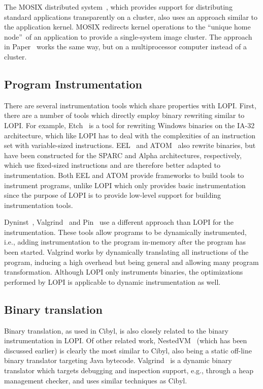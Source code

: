 The MOSIX distributed system~\cite{mosix}, which provides support for
distributing standard applications transparently on a cluster, also uses an
approach similar to the application kernel. MOSIX redirects kernel operations
to the ``unique home node''~of an application to provide a single-system image
cluster.  The approach in Paper~ works the same way,
but on a multiprocessor computer instead of a cluster.


\subsection{Program Instrumentation}
There are several instrumentation tools which share properties with LOPI.
First, there are a number of tools which directly employ binary rewriting
similar to LOPI. For example, Etch~\cite{etch} is a tool for rewriting Windows
binaries on the IA-32 architecture, which like LOPI has to deal with the
complexities of an instruction set with variable-sized instructions.
EEL~\cite{eel} and ATOM~\cite{atom} also rewrite binaries, but have been
constructed for the SPARC and Alpha architectures, respectively, which use
fixed-sized instructions and are therefore better adapted to instrumentation.
Both EEL and ATOM provide frameworks to build tools to instrument programs,
unlike LOPI which only provides basic instrumentation since the purpose of
LOPI is to provide low-level support for building instrumentation tools.

Dyninst~\cite{buck00dyninst}, Valgrind~\cite{valgrind} and Pin~\cite{luk05pin}
use a different approach than LOPI for the instrumentation. These tools allow
programs to be dynamically instrumented, i.e., adding instrumentation to the
program in-memory after the program has been started. Valgrind works by
dynamically translating all instructions of the program, inducing a high
overhead but being general and allowing many program transformation. Although
LOPI only instruments binaries, the optimizations performed by LOPI is
applicable to dynamic instrumentation as well.


\subsection{Binary translation}
Binary translation, as used in Cibyl, is also closely related to the binary
instrumentation in LOPI. Of other related work,
NestedVM~\cite{alliet04nestedvm} (which has been discussed earlier) is clearly
the most similar to Cibyl, also being a static off-line binary translator
targeting Java bytecode. Valgrind~\cite{valgrind} is a dynamic binary
translator which targets debugging and inspection support, e.g., through a
heap management checker, and uses similar techniques as Cibyl.

